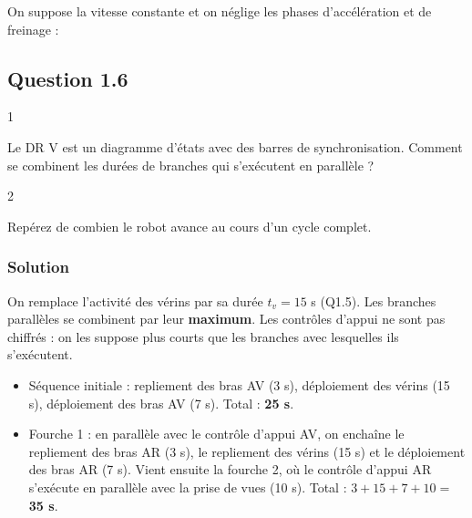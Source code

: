 \documentclass[11pt,a4paper]{article}
\providecommand{\tightlist}{\setlength{\itemsep}{0pt}\setlength{\parskip}{0pt}}
\newcommand{\equationajustee}[1]{%
  \sbox{\boiteequation}{$\displaystyle #1$}%
  \ifdim\wd\boiteequation>\linewidth
    \[\resizebox{\linewidth}{!}{\usebox{\boiteequation}}\]%
  \else
    \[#1\]%
  \fi}
\begin{document}
On suppose la vitesse constante et on néglige les phases d'accélération et de freinage :

\equationajustee{\begin{aligned}
t_v &= \frac{c}{V} \\
&= \frac{100\times 60}{400}\ \text{s}
\end{aligned}}

\equationajustee{\boxed{t_v = 15\ \text{s}}}

\hypertarget{question-1.6}{%
\subsection{Question 1.6}\label{question-1.6}}

\begin{indication}{1}

Le DR V est un diagramme d'états avec des barres de synchronisation. Comment se combinent les durées de branches qui s'exécutent en parallèle ?

\end{indication}

\begin{indication}{2}

Repérez de combien le robot avance au cours d'un cycle complet.

\end{indication}

\hypertarget{solution-5}{%
\subsubsection{Solution}\label{solution-5}}

On remplace l'activité des vérins par sa durée \(t_v = 15\) s (Q1.5). Les branches parallèles se combinent par leur \textbf{maximum}. Les contrôles d'appui ne sont pas chiffrés : on les suppose plus courts que les branches avec lesquelles ils s'exécutent.

\begin{itemize}
\tightlist
\item
  Séquence initiale : repliement des bras AV (3 s), déploiement des vérins (15 s), déploiement des bras AV (7 s). Total : \textbf{25 s}.
\item
  Fourche 1 : en parallèle avec le contrôle d'appui AV, on enchaîne le repliement des bras AR (3 s), le repliement des vérins (15 s) et le déploiement des bras AR (7 s). Vient ensuite la fourche 2, où le contrôle d'appui AR s'exécute en parallèle avec la prise de vues (10 s). Total : \(3 + 15 + 7 + 10 =\) \textbf{35 s}.
\end{itemize}
\end{document}
